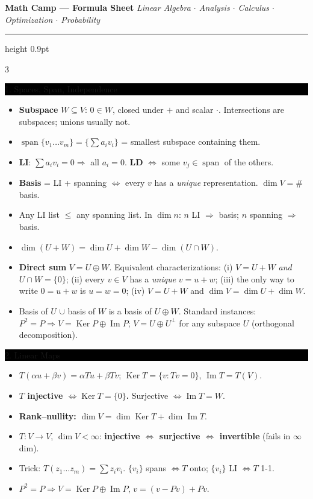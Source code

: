 \documentclass[8pt,letterpaper]{article}
\makeatletter
\newcommand{\bodysize}{\fontsize{6.15}{6.95}\selectfont}
\newcommand{\sect}[1]{%
  \vspace{2.2pt}%
  \noindent\colorbox{black}{\parbox{\dimexpr\linewidth-2\fboxsep}{%
    \color{white}\bfseries\scshape\fontsize{6.4}{7.4}\selectfont
    \hyphenpenalty=10000\exhyphenpenalty=10000\raggedright #1}}%
  \vspace{1.4pt}\par\nopagebreak\@afterheading}
\newenvironment{tl}
  {\begin{itemize}[leftmargin=6pt,itemsep=0.3pt,topsep=1pt,parsep=0pt,
                   partopsep=0pt,label=\textcolor{gray}{\tiny$\bullet$}]}
  {\end{itemize}}
\newcommand{\Ker}{\operatorname{Ker}}
\newcommand{\Ima}{\operatorname{Im}}
\newcommand{\spn}{\operatorname{span}}
\makeatother
\begin{document}
\bodysize

\begin{center}
  \vspace{-6pt}
  {\fontsize{10}{11}\selectfont\bfseries Math Camp --- Formula Sheet}\quad
  {\itshape\fontsize{6}{7}\selectfont Linear Algebra $\cdot$ Analysis $\cdot$ Calculus $\cdot$ Optimization $\cdot$ Probability}
\end{center}
\vspace{-4pt}
\hrule height 0.9pt
\vspace{3pt}

\begin{multicols}{3}
\bodysize

\sect{1. Spaces, Span, Independence}
\begin{tl}
\item \textbf{Subspace} $W\subseteq V$: $0\in W$, closed under $+$ and scalar $\cdot$. Intersections are subspaces; unions usually not.
\item $\spn\{v_1\dots v_m\}=\{\sum a_iv_i\}$ = smallest subspace containing them.
\item \textbf{LI}: $\sum a_iv_i=0\Rightarrow$ all $a_i=0$. \textbf{LD} $\iff$ some $v_j\in\spn$ of the others.
\item \textbf{Basis} = LI + spanning $\iff$ every $v$ has a \emph{unique} representation. $\dim V=\#$basis.
\item Any LI list $\le$ any spanning list. In $\dim n$: $n$ LI $\Rightarrow$ basis; $n$ spanning $\Rightarrow$ basis.
\item $\dim(U+W)=\dim U+\dim W-\dim(U\cap W)$.
\item \textbf{Direct sum} $V=U\oplus W$. Equivalent characterizations: (i) $V=U+W$ \emph{and} $U\cap W=\{0\}$; (ii) every $v\in V$ has a \emph{unique} $v=u+w$; (iii) the only way to write $0=u+w$ is $u=w=0$; (iv) $V=U+W$ and $\dim V=\dim U+\dim W$.
\item Basis of $U$ $\cup$ basis of $W$ is a basis of $U\oplus W$. Standard instances: $P^2=P\Rightarrow V=\Ker P\oplus\Ima P$; $V=U\oplus U^\perp$ for any subspace $U$ (orthogonal decomposition).
\end{tl}

\sect{2. Linear Maps}
\begin{tl}
\item $T(\alpha u+\beta v)=\alpha Tu+\beta Tv$; $\Ker T=\{v:Tv=0\}$, $\Ima T=T(V)$.
\item \textbf{$T$ injective $\iff \Ker T=\{0\}$.} Surjective $\iff \Ima T=W$.
\item \textbf{Rank--nullity:} $\dim V=\dim\Ker T+\dim\Ima T$.
\item $T:V\to V$, $\dim V<\infty$: \textbf{injective $\iff$ surjective $\iff$ invertible} (fails in $\infty$ dim).
\item Trick: $T(z_1\dots z_m)=\sum z_iv_i$. $\{v_i\}$ spans $\iff T$ onto; $\{v_i\}$ LI $\iff T$ 1-1.
\item $P^2=P\Rightarrow V=\Ker P\oplus\Ima P$, $v=(v-Pv)+Pv$.
\end{tl}


\end{multicols}
\end{document}
